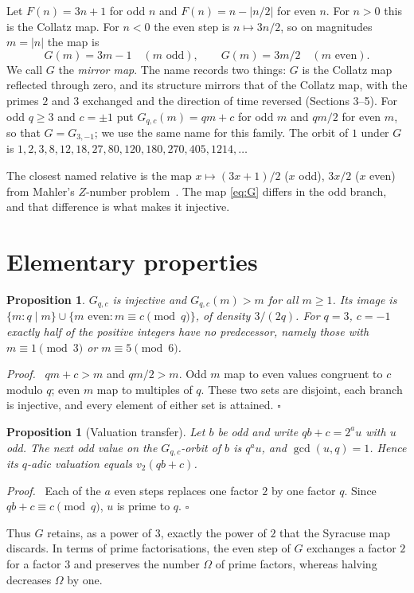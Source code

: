 \documentclass[11pt]{article}
\newtheorem{proposition}[theorem]{Proposition}
\newenvironment{proof}{\par\noindent\textit{Proof.}\ }{\hfill$\square$\par\medskip}
\begin{document}
Let $F(n)=3n+1$ for odd $n$ and $F(n)=n-|n/2|$ for even $n$. For $n>0$ this is the Collatz map. For $n<0$ the even
step is $n\mapsto 3n/2$, so on magnitudes $m=|n|$ the map is
\begin{equation}\label{eq:G}
G(m)=3m-1\quad(m\text{ odd}),\qquad G(m)=3m/2\quad(m\text{ even}).
\end{equation}
We call $G$ the \emph{mirror map}. The name records two things: $G$ is the Collatz map reflected through zero, and
its structure mirrors that of the Collatz map, with the primes $2$ and $3$ exchanged and the direction of time
reversed (Sections 3--5). For odd $q\ge 3$ and $c=\pm 1$ put $G_{q,c}(m)=qm+c$ for odd $m$ and $qm/2$ for even $m$,
so that $G=G_{3,-1}$; we use the same name for this family.
The orbit of $1$ under $G$ is $1,2,3,8,12,18,27,80,120,180,270,405,1214,\dots$

The closest named relative is the map $x\mapsto(3x+1)/2$ ($x$ odd), $3x/2$ ($x$ even) from Mahler's $Z$-number
problem~\cite{Ma}. The map \eqref{eq:G} differs in the odd branch, and that difference is what makes it injective.

\section{Elementary properties}

\begin{proposition}\label{prop:inj}
$G_{q,c}$ is injective and $G_{q,c}(m)>m$ for all $m\ge 1$. Its image is
$\{m: q\mid m\}\cup\{m\text{ even}: m\equiv c \pmod q\}$, of density $3/(2q)$. For $q=3$, $c=-1$ exactly half of
the positive integers have no predecessor, namely those with $m\equiv 1\pmod 3$ or $m\equiv 5\pmod 6$.
\end{proposition}
\begin{proof}
$qm+c>m$ and $qm/2>m$. Odd $m$ map to even values congruent to $c$ modulo $q$; even $m$ map to multiples of $q$.
These two sets are disjoint, each branch is injective, and every element of either set is attained.
\end{proof}

\begin{proposition}[Valuation transfer]\label{prop:val}
Let $b$ be odd and write $qb+c=2^{a}u$ with $u$ odd. The next odd value on the $G_{q,c}$-orbit of $b$ is $q^{a}u$,
and $\gcd(u,q)=1$. Hence its $q$-adic valuation equals $v_2(qb+c)$.
\end{proposition}
\begin{proof}
Each of the $a$ even steps replaces one factor $2$ by one factor $q$. Since $qb+c\equiv c\pmod q$, $u$ is prime to $q$.
\end{proof}
Thus $G$ retains, as a power of $3$, exactly the power of $2$ that the Syracuse map discards. In terms of prime
factorisations, the even step of $G$ exchanges a factor $2$ for a factor $3$ and preserves the number $\Omega$ of
prime factors, whereas halving decreases $\Omega$ by one.
\end{document}
